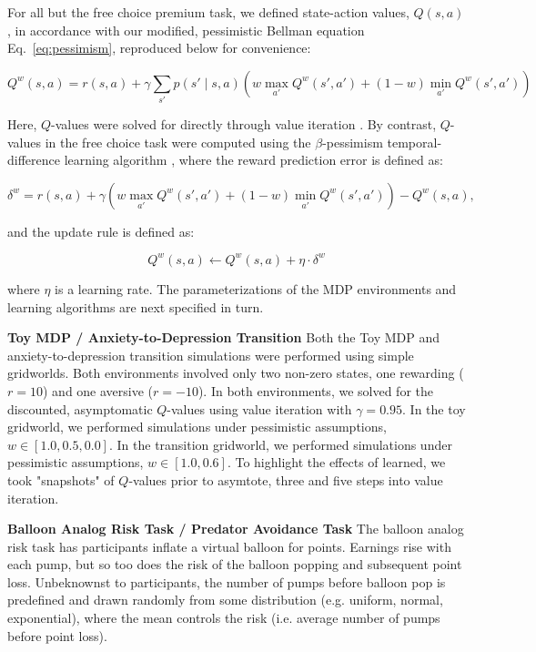 \documentclass[11pt]{article} %
\begin{document}
For all but the free choice premium task, we defined state-action values, $Q(s,a)$, in accordance with our modified, pessimistic Bellman equation Eq.~\ref{eq:pessimism}, reproduced below for convenience:

\begin{equation*}
Q^w(s,a) = r(s,a) + \gamma \sum_{s'} p(s' \mid s,a) \left( w \max_{a'} Q^w(s',a') + (1 - w) \min_{a'} Q^w(s',a') \right)
\end{equation*}

Here, $Q$-values were solved for directly through value iteration \citep{SuttonBarto2018}. By contrast, $Q$-values in the free choice task were computed using the $\beta$-pessimism temporal-difference learning algorithm \citep{Gaskett2003}, where the reward prediction error is defined as:

\begin{equation*}
\delta^w = r(s,a) + \gamma \left( w \max_{a'} Q^w(s',a') + (1 - w) \min_{a'} Q^w(s',a') \right) - Q^w(s,a), 
\end{equation*}

and the update rule is defined as:

\begin{equation*}
Q^w(s,a) \leftarrow Q^w(s,a) + \eta \cdot \delta^w
\end{equation*}

where $\eta$ is a learning rate. The parameterizations of the MDP environments and learning algorithms are next specified in turn.

\textbf{Toy MDP / Anxiety-to-Depression Transition} Both the Toy MDP and anxiety-to-depression transition simulations were performed using simple gridworlds. Both environments involved only two non-zero states, one rewarding ($r=10$) and one aversive ($r=-10$). In both environments, we solved for the discounted, asymptomatic $Q$-values using value iteration with $\gamma = 0.95$. In the toy gridworld, we performed simulations under pessimistic assumptions, $w \in [1.0, 0.5, 0.0]$. In the transition gridworld, we performed simulations under pessimistic assumptions, $w \in [1.0, 0.6]$. To highlight the effects of learned, we took "snapshots" of $Q$-values prior to asymtote, three and five steps into value iteration. 

\textbf{Balloon Analog Risk Task / Predator Avoidance Task} The balloon analog risk task \citep{Lejuez2002} has participants inflate a virtual balloon for points. Earnings rise with each pump, but so too does the risk of the balloon popping and subsequent point loss. Unbeknownst to participants, the number of pumps before balloon pop is predefined and drawn randomly from some distribution (e.g. uniform, normal, exponential), where the mean controls the risk (i.e. average number of pumps before point loss). 
\end{document}
